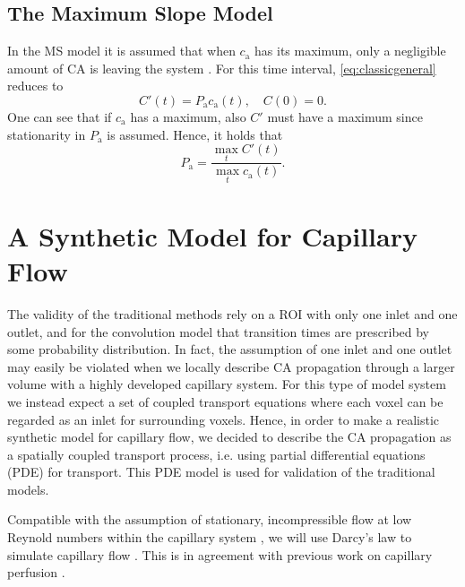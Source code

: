 \documentclass[journal,twocolumn]{IEEEtran}
\newcommand{\ca}{c_\mathrm{a}}
\newcommand{\Pa}{P_{\mathrm{a}}}
\begin{document}
	\subsection{The Maximum Slope Model}\label{sec:ms}	
	In the MS model it is assumed that when $\ca$ has its maximum, only a negligible amount of CA is leaving the system \cite{klotz99}.
	For this time interval, \eqref{eq:classicgeneral} reduces to 
	\begin{equation}
		C'(t) = \Pa\ca(t), \quad C(0) = 0.
	\end{equation}
	One can see that if $\ca$ has a maximum, also $C'$ must have a maximum since stationarity in $\Pa$ is assumed.
	Hence, it holds that
	\begin{equation}\label{eq:MS}
		\Pa = \frac{\max_{t}C'(t)}{\max_{t}\ca(t)}.
	\end{equation}
	
	
	
	\section{A Synthetic Model for Capillary Flow}\label{sec:synthetic}
	
	The validity of the traditional methods rely on a ROI with only one inlet and one outlet, and for the convolution model that transition times are prescribed by some probability distribution.
	In fact, the assumption of one inlet and one outlet  may easily be violated when we locally describe CA propagation through a larger volume with a highly developed capillary system.
	For this type of model system we instead expect a set of coupled transport equations where each voxel can be regarded as an inlet for surrounding voxels.
	Hence, in order to make a realistic synthetic model for capillary flow, we decided to describe the CA propagation as a spatially coupled transport process, i.e. using partial differential equations (PDE) for transport. This PDE model is used for validation of the traditional models. 
	
	Compatible with the assumption of stationary, incompressible flow at low Reynold numbers within the capillary system \cite{Cho2011}, we will use Darcy's law to simulate capillary flow \cite{Darcy56}. 
	This is in agreement with previous work on capillary perfusion \cite{Cookson2012,Michler2013}. 
	
\end{document}
